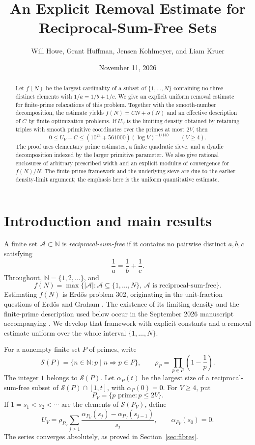 \documentclass[11pt]{amsart}
\title[Reciprocal-sum-free sets]{An Explicit Removal Estimate for\\Reciprocal-Sum-Free Sets}
\author[W. Howe, G. Huffman, J. Kohlmeyer, and L. Kruer]{Will Howe, Grant Huffman, Jensen Kohlmeyer, and Liam Kruer}
\date{November 11, 2026}
\theoremstyle{definition}
\theoremstyle{remark}
\numberwithin{equation}{section}
\newcommand{\N}{\mathbb N}
\newcommand{\Sp}{\mathcal S}
\newcommand{\cA}{\mathcal A}
\begin{document}
\begin{abstract}
Let $f(N)$ be the largest cardinality of a subset of $\{1,\ldots,N\}$ containing no three distinct elements with $1/a=1/b+1/c$.
We give an explicit uniform removal estimate for finite-prime relaxations of this problem.
Together with the smooth-number decomposition, the estimate yields $f(N)=CN+o(N)$ and an effective description of $C$ by finite optimization problems.
If $U_V$ is the limiting density obtained by retaining triples with smooth primitive coordinates over the primes at most $2V$, then
\[
0\le U_V-C\le (10^{23}+561000)(\log V)^{-1/140}\qquad(V\ge4).
\]
The proof uses elementary prime estimates, a finite quadratic sieve, and a dyadic decomposition indexed by the larger primitive parameter.
We also give rational enclosures of arbitrary prescribed width and an explicit modulus of convergence for $f(N)/N$.
The finite-prime framework and the underlying sieve are due to the earlier density-limit argument; the emphasis here is the uniform quantitative estimate.
\end{abstract}

\maketitle

\section{Introduction and main results}

A finite set $\cA\subset\N$ is \emph{reciprocal-sum-free} if it contains no pairwise distinct $a,b,c$ satisfying
\begin{equation}\label{eq:reciprocal}
\frac1a=\frac1b+\frac1c.
\end{equation}
Throughout, $\N=\{1,2,\ldots\}$, and
\[
f(N)=\max\bigl\{|\cA|:\cA\subseteq\{1,\ldots,N\},\ \cA\text{ is reciprocal-sum-free}\bigr\}.
\]
Estimating $f(N)$ is Erd\H{o}s problem 302, originating in the unit-fraction questions of Erd\H{o}s and Graham \cite{EG}.
The existence of its limiting density and the finite-prime description used below occur in the September 2026 manuscript accompanying \cite{CGM}.
We develop that framework with explicit constants and a removal estimate uniform over the whole interval $\{1,\ldots,N\}$.

For a nonempty finite set $P$ of primes, write
\[
\Sp(P)=\{n\in\N:p\mid n\Longrightarrow p\in P\},
\qquad
\rho_P=\prod_{p\in P}\left(1-\frac1p\right).
\]
The integer $1$ belongs to $\Sp(P)$.
Let $\alpha_P(t)$ be the largest size of a reciprocal-sum-free subset of $\Sp(P)\cap[1,t]$, with $\alpha_P(0)=0$.
For $V\ge4$, put
\begin{equation}\label{eq:Pdef}
P_V=\{p\text{ prime}:p\le2V\}.
\end{equation}
If $1=s_1<s_2<\cdots$ are the elements of $\Sp(P_V)$, define
\begin{equation}\label{eq:Udef}
U_V=\rho_{P_V}\sum_{j\ge1}\frac{\alpha_{P_V}(s_j)-\alpha_{P_V}(s_{j-1})}{s_j},
\qquad \alpha_{P_V}(s_0)=0.
\end{equation}
The series converges absolutely, as proved in Section~\ref{sec:fibres}.
\end{document}

